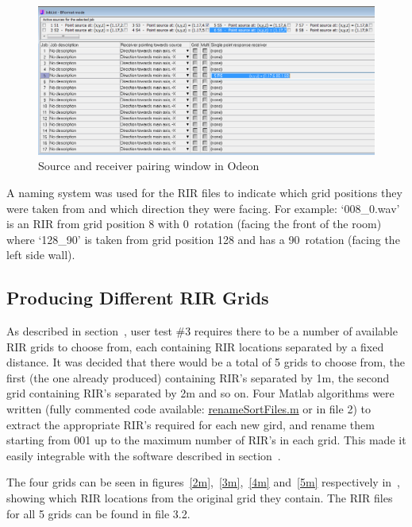 \documentclass[../../main.tex]{subfiles}
\begin{document}
			\begin{figure}
				\centerline{\includegraphics[scale = 0.54]{Sections/Implementation/Odeon/images/SouRecPos/SouRecSelection_crop.png}}
				\caption{Source and receiver pairing window in Odeon}
				\label{SouRecPos}
			\end{figure}

			A naming system was used for the \ac{RIR} files to indicate which grid positions they were taken from and which direction they were facing. For example: `008\_0.wav' is an \ac{RIR} from grid position 8 with 0\textdegree~rotation (facing the front of the room) where `128\_90' is taken from grid position 128 and has a 90\textdegree~rotation (facing the left side wall).

	\subsection{Producing Different RIR Grids}
	\label{odeon:grids}
		As described in section~, user test \#3 requires there to be a number of available \ac{RIR} grids to choose from, each containing \ac{RIR} locations separated by a fixed distance. It was decided that there would be a total of 5 grids to choose from, the first (the one already produced) containing \ac{RIR}'s separated by 1m, the second grid containing \ac{RIR}'s separated by 2m and so on.	 Four Matlab algorithms were written (fully commented code available: \href{http://lt669.github.io/code/matlab/html/renameSortFiles.html}{renameSortFiles.m} or in file 2) to extract the appropriate \ac{RIR}'s required for each new gird, and rename them starting from 001 up to the maximum number of \ac{RIR}'s in each grid. This made it easily integrable with the software described in section~.

		The four grids can be seen in figures~\ref{2m},~\ref{3m},~\ref{4m} and~\ref{5m} respectively in~, showing which \ac{RIR} locations from the original grid they contain. The \ac{RIR} files for all 5 grids can be found in file 3.2.
\end{document}
